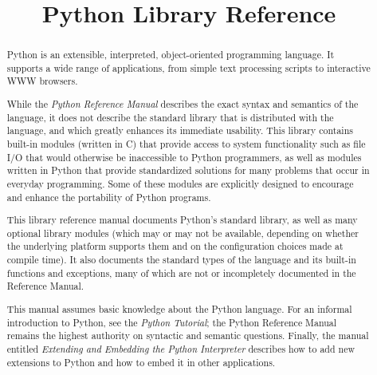 

\title{Python Library Reference}



\makeindex			%





\maketitle



\begin{abstract}

\noindent
Python is an extensible, interpreted, object-oriented programming
language.  It supports a wide range of applications, from simple text
processing scripts to interactive WWW browsers.

While the {\em Python Reference Manual} describes the exact syntax and
semantics of the language, it does not describe the standard library
that is distributed with the language, and which greatly enhances its
immediate usability.  This library contains built-in modules (written
in C) that provide access to system functionality such as file I/O
that would otherwise be inaccessible to Python programmers, as well as
modules written in Python that provide standardized solutions for many
problems that occur in everyday programming.  Some of these modules
are explicitly designed to encourage and enhance the portability of
Python programs.

This library reference manual documents Python's standard library, as
well as many optional library modules (which may or may not be
available, depending on whether the underlying platform supports them
and on the configuration choices made at compile time).  It also
documents the standard types of the language and its built-in
functions and exceptions, many of which are not or incompletely
documented in the Reference Manual.

This manual assumes basic knowledge about the Python language.  For an
informal introduction to Python, see the {\em Python Tutorial}; the
Python Reference Manual remains the highest authority on syntactic and
semantic questions.  Finally, the manual entitled {\em Extending and
Embedding the Python Interpreter} describes how to add new extensions
to Python and how to embed it in other applications.

\end{abstract}

